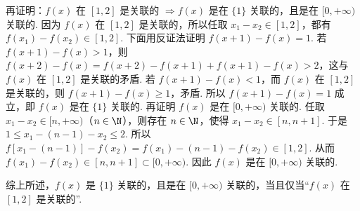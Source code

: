 \begin{solution}
\begin{enumerate}
再证明：\(f(x)\) 在 \([1,2]\) 是关联的 \(\Rightarrow f(x)\) 是在 \(\{1\}\) 关联的，且是在 \([0,+\infty)\) 关联的. 因为 \(f(x)\) 在 \([1,2]\) 是关联的，所以任取 \(x_1-x_2\in[1,2]\)，都有 \(f(x_1)-f(x_2)\in[1,2]\). 下面用反证法证明 \(f(x+1)-f(x)=1\). 若 \(f(x+1)-f(x)>1\)，则 \(f(x+2)-f(x)=f(x+2)-f(x+1)+f(x+1)-f(x)>2\)，这与 \(f(x)\) 在 \([1,2]\) 是关联的矛盾. 若 \(f(x+1)-f(x)<1\)，而 \(f(x)\) 在 \([1,2]\) 是关联的，则 \(f(x+1)-f(x)\ge 1\)，矛盾. 所以 \(f(x+1)-f(x)=1\) 成立，即 \(f(x)\) 是在 \(\{1\}\) 关联的. 再证明 \(f(x)\) 是在 \([0,+\infty)\) 关联的. 任取 \(x_1-x_2\in[n,+\infty)\)（\(n\in \N\)），则存在 \(n\in \N\)，使得 \(x_1-x_2\in[n,n+1]\). 于是 \(1\le x_1-(n-1)-x_2\le 2\). 所以 \(f\left[ x_1-(n-1) \right]-f(x_2)=f(x_1)-(n-1)-f(x_2)\in[1,2]\). 从而 \(f(x_1)-f(x_2)\in[n,n+1]\subset[0,+\infty)\). 因此 \(f(x)\) 是在 \([0,+\infty)\) 关联的.

综上所述，\(f(x)\) 是 \(\{1\}\) 关联的，且是在 \([0,+\infty)\) 关联的，当且仅当“\(f(x)\) 在 \([1,2]\) 是关联的”.
\end{enumerate}
\end{solution}
